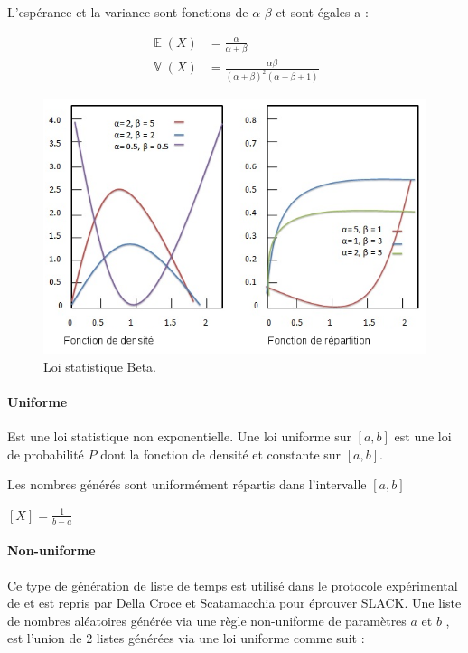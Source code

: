 \documentclass[a4paper,12pt]{report}
\DeclareMathOperator{\E}{\mathbb{E}} %
\DeclareMathOperator{\V}{\mathbb{V}} %
\theoremstyle{plain}				%
\theoremstyle{definition}				%
\begin{document}
L’espérance et la variance sont fonctions de $\alpha$ $\beta$ et sont égales a :

\begin{align*}
	\E(X) &= \frac{\alpha}{\alpha + \beta} \\
	\V(X) &= \frac{\alpha \beta}{(\alpha + \beta)^2 (\alpha + \beta + 1)} 
\end{align*}

\begin{figure}
{\centering
\includegraphics[width=\columnwidth]{loiStatBeta.png}
\caption{Loi statistique Beta.}
\label{fig:LoiStatistiquesBeta}
\par}
\end{figure}



\paragraph{Uniforme} Est une loi statistique non exponentielle. Une loi uniforme sur $[a, b]$ 
  est une loi de probabilité $P$ dont la fonction de densité et constante sur $[a, b]$. 
  
Les nombres générés sont uniformément répartis dans l'intervalle $[a, b]$

\begin{center}
$[X] = \frac{1}{b-a}$
\end{center}

\paragraph{Non-uniforme} Ce type de génération de liste de temps est utilisé dans le protocole expérimental de \cite{frangioni2004multi} et est repris par Della Croce et Scatamacchia \cite{della2020longest} pour éprouver SLACK.
Une liste de nombres aléatoires générée via une règle non-uniforme de paramètres $a$ et $b$ , est l'union de 2 listes générées via une loi uniforme comme suit :
\end{document}
